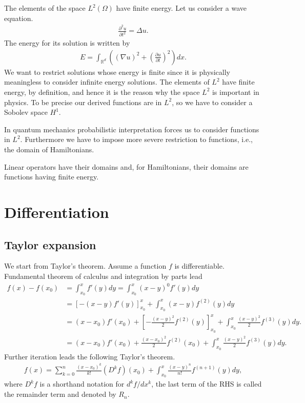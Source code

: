 \documentclass[openany, a4paper, oneside]{jsbook}
\theoremstyle{break}
\theoremstyle{breakdefn}
\newcommand{\rbk}[1]{\left (#1\right)}
\newcommand{\sqbk}[1]{\left[#1\right]}
\begin{document}
The elements of the space $L^2 \rbk{\Omega}$ have finite energy.
Let us consider a wave equation.
\begin{align}
 \frac{\partial^2 u}{\partial t^2}
 =
 \Delta u.
\end{align}
The energy for its solution is written by
\begin{align}
 E
 =
 \int_{\mathbb{R}^d} \rbk{\rbk{\nabla u}^2 + \rbk{\frac{\partial u}{\partial t}}^2}dx.
\end{align}
We want to restrict solutions whose energy is finite
since it is physically meaningless to consider infinite energy solutions.
The elements of $L^2$ have finite energy, by definition,
and hence it is the reason why the space $L^2$ is important in physics.
To be precise our derived functions are in $L^2$, so
we have to consider a Sobolev space $H^1$.

In quantum mechanics probabilistic interpretation forces us to
consider functions in $L^2$.
Furthermore we have to impose more severe restriction to functions,
i.e., the domain of Hamiltonians.

Linear operators have their domains
and, for Hamiltonians, their domains are functions having finite energy.
\section{Differentiation}

\subsection{Taylor expansion}


We start from Taylor's theorem.
Assume a function $f$ is differentiable.
Fundamental theorem of calculus and integration by parts lead
\begin{align}
 f(x) - f(x_0)
 &=
 \int_{x_0}^{x} f'(y) dy
 =
 \int_{x_0}^x (x - y)^{0} f'(y) dy \\
 &=
 \sqbk{- \rbk{x - y} f'(y)}_{x_0}^x + \int_{x_0}^x \rbk{x - y} f^{(2)} (y) dy \\
 &=
 (x - x_0) f'(x_0) + \sqbk{- \frac{(x-y)^2}{2} f^{(2)}(y)}_{x_0}^x + \int_{x_0}^x \frac{(x - y)^2}{2} f^{(3)} (y)dy. \\
 &=
 (x - x_0) f'(x_0) + \frac{(x-x_0)^2}{2} f^{(2)}(x_0) + \int_{x_0}^x \frac{(x - y)^2}{2} f^{(3)} (y)dy.
\end{align}
Further iteration leads the following Taylor's theorem.
\begin{align}
 f(x)
 =
 \sum_{k=0}^{n} \frac{(x - x_0)^k}{k!} \left( D^k f \right) (x_0) +
  \int_{x_0}^{x} \frac{(x - y)^{n}}{n!} f^{(n+1)} (y) dy,
\end{align}
where $D^k f$ is a shorthand notation for  $d^k f/ dx^k$,
the last term of the RHS is called the remainder term
and denoted by $R_n$.
\end{document}
